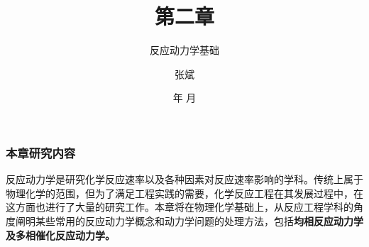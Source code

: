 \documentclass[dvipsnames, svgnames, x11names]{beamer}
\title{第二章}
\subtitle{反应动力学基础}
\author{张斌}
\institute[理工系]{河北农业大学 理工系}
\date{\the\year 年 \the\month 月}
\begin{document}
\begin{frame}
	\titlepage
	\thispagestyle{empty}
	\addtocounter{framenumber}{-1}
\end{frame}


\begin{frame}
	\frametitle{本章研究内容}
	\qquad \Large 反应动力学是研究化学反应速率以及各种因素对反应速率影响的学科。传统上属于物理化学的范围，但为了满足工程实践的需要，化学反应工程在其发展过程中，在这方面也进行了大量的研究工作。本章将在物理化学基础上，从反应工程学科的角度阐明某些常用的反应动力学概念和动力学问题的处理方法，包括\bf{均相反应动力学}及\bf{多相催化反应动力学}。
\end{frame}


\begin{frame}{}
	\begin{center}
		{\Huge {}}
	\end{center}
	\tableofcontents
	\thispagestyle{empty}
	\addtocounter{framenumber}{-1}
\end{frame}










\end{document}
